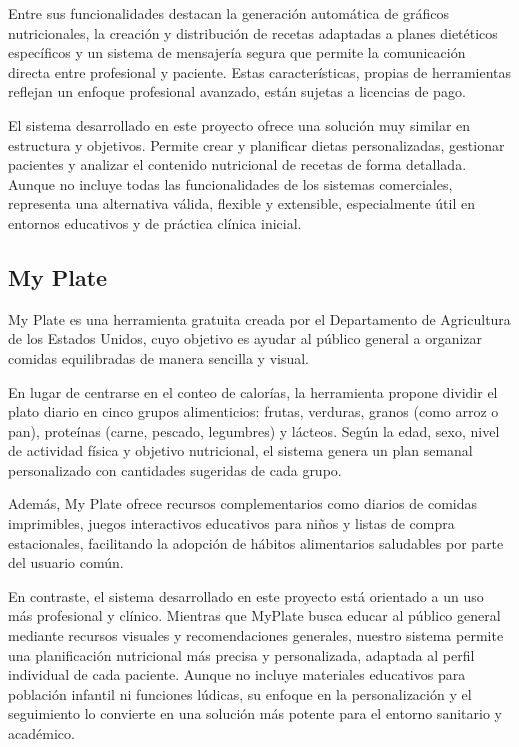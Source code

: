 Entre sus funcionalidades destacan la generación automática de gráficos nutricionales, la creación y distribución de recetas adaptadas a planes dietéticos específicos y un sistema de mensajería segura que permite la comunicación directa entre profesional y paciente. Estas características, propias de herramientas reflejan un enfoque profesional avanzado, están sujetas a licencias de pago.

El sistema desarrollado en este proyecto ofrece una solución muy similar en estructura y objetivos. Permite crear y planificar dietas personalizadas, gestionar pacientes y analizar el contenido nutricional de recetas de forma detallada. Aunque no incluye todas las funcionalidades de los sistemas comerciales, representa una alternativa válida, flexible y extensible, especialmente útil en entornos educativos y de práctica clínica inicial.

\subsection{My Plate\cite{Myplate}}
My Plate es una herramienta gratuita creada por el Departamento de Agricultura de los Estados Unidos, cuyo objetivo es ayudar al público general a organizar comidas equilibradas de manera sencilla y visual.

En lugar de centrarse en el conteo de calorías, la herramienta propone dividir el plato diario en cinco grupos alimenticios: frutas, verduras, granos (como arroz o pan), proteínas (carne, pescado, legumbres) y lácteos. Según la edad, sexo, nivel de actividad física y objetivo nutricional, el sistema genera un plan semanal personalizado con cantidades sugeridas de cada grupo.

Además, My Plate ofrece recursos complementarios como diarios de comidas imprimibles, juegos interactivos educativos para niños y listas de compra estacionales, facilitando la adopción de hábitos alimentarios saludables por parte del usuario común.

En contraste, el sistema desarrollado en este proyecto está orientado a un uso más profesional y clínico. Mientras que MyPlate busca educar al público general mediante recursos visuales y recomendaciones generales, nuestro sistema permite una planificación nutricional más precisa y personalizada, adaptada al perfil individual de cada paciente. Aunque no incluye materiales educativos para población infantil ni funciones lúdicas, su enfoque en la personalización y el seguimiento lo convierte en una solución más potente para el entorno sanitario y académico.

